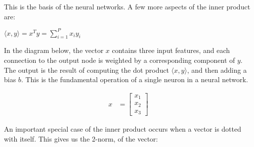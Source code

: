 This is the basis of the neural networks. A few more aspects of the inner product are:

\vspace{0.8em} 

$\langle x,y \rangle = x^T y = \sum_{i=1}^{P}x_i y_i$

\vspace{1em} 

In the diagram below, the vector $x$ contains three input features, and each connection
to the output node is weighted by a corresponding component of $y$. The output is the
result of computing the dot product $\langle x, y \rangle$, and then adding a bias $b$. 
This is the fundamental operation of a single neuron in a neural network.


\begin{center}
	\begin{minipage}[c]{0.35\textwidth}
		\begin{align*}
			x &= \begin{bmatrix} x_1 \\ x_2 \\ x_3 \end{bmatrix}
		\end{align*}
	\end{minipage}
	\hfill
	\begin{minipage}[c]{0.6\textwidth}
	\end{minipage}
\end{center}

An important special case of the inner product occurs when a vector is dotted 
with itself. This gives us the 2-norm, of the vector:

